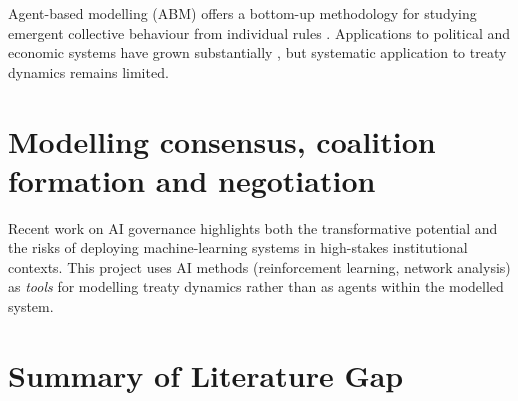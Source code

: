 Agent-based modelling (ABM) offers a bottom-up methodology for studying emergent
collective behaviour from individual rules \parencite{Epstein1996}.
Applications to political and economic systems have grown substantially
\parencite{Farmer2009}, but systematic application to treaty dynamics remains limited.


\section{Modelling consensus, coalition formation and negotiation}
\label{sec:ai-policy}

Recent work on AI governance \parencite{Dafoe2020} highlights both the transformative
potential and the risks of deploying machine-learning systems in high-stakes institutional
contexts.
This project uses AI methods (reinforcement learning, network analysis) as \emph{tools}
for modelling treaty dynamics rather than as agents within the modelled system.


\section{Summary of Literature Gap}
\label{sec:gap}

